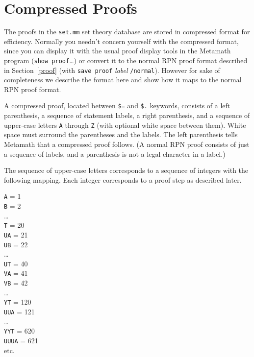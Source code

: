 \chapter{Compressed Proofs}
\label{compressed}

The proofs in the \texttt{set.mm} set theory database are stored in compressed
format for efficiency.  Normally you needn't concern yourself with the
compressed format, since you can display it with the usual proof display tools
in the Metamath program (\texttt{show proof}\ldots) or convert it to the normal
RPN proof format described in Section~\ref{proof} (with \texttt{save proof}
{\em label} \texttt{/normal}).  However for sake of completeness we describe the
format here and show how it maps to the normal RPN proof format.

A compressed proof, located between \texttt{\$=} and \texttt{\$.} keywords, consists
of a left parenthesis, a sequence of statement labels, a right parenthesis,
and a sequence of upper-case letters \texttt{A} through \texttt{Z} (with optional
white space between them).  White space must surround the parentheses
and the labels.  The left parenthesis tells Metamath that a
compressed proof follows.  (A normal RPN proof consists of just a sequence of
labels, and a parenthesis is not a legal character in a label.)

The sequence of upper-case letters corresponds to a sequence of integers
with the following mapping.  Each integer corresponds to a proof step as
described later.
\begin{center}
  \texttt{A} = 1 \\
  \texttt{B} = 2 \\
   \ldots \\
  \texttt{T} = 20 \\
  \texttt{UA} = 21 \\
  \texttt{UB} = 22 \\
   \ldots \\
  \texttt{UT} = 40 \\
  \texttt{VA} = 41 \\
  \texttt{VB} = 42 \\
   \ldots \\
  \texttt{YT} = 120 \\
  \texttt{UUA} = 121 \\
   \ldots \\
  \texttt{YYT} = 620 \\
  \texttt{UUUA} = 621 \\
   etc.
\end{center}

